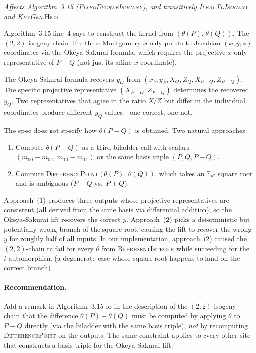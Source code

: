 \documentclass[a4paper,11pt]{article}
\newcommand{\algo}[1]{Algorithm~#1}
\newcommand{\Fpii}{\mathbb{F}_{p^2}}
\newcommand{\high}{\textsc{\color{BurntOrange}High}}
\newcommand{\finding}[2]{\noindent\textit{#1}\hfill#2\par\smallskip}
\begin{document}
\finding{Affects \algo{3.15}
(\textsc{FixedDegreeIsogeny}), and transitively
\textsc{IdealToIsogeny} and \textsc{KeyGen}.}{\high}

\algo{3.15} line~4 says to construct the kernel from
$(\theta(P),\, \theta(Q))$.  The $(2,2)$-isogeny chain lifts
these Montgomery $x$-only points to Jacobian $(x,y,z)$
coordinates via the Okeya-Sakurai formula, which requires the
projective $x$-only representative of $P{-}Q$ (not just its
affine $x$-coordinate).

The Okeya-Sakurai formula recovers $y_Q$ from
$(x_P, y_P, X_Q, Z_Q, X_{P{-}Q}, Z_{P{-}Q})$.  The specific
projective representative $(X_{P{-}Q} : Z_{P{-}Q})$ determines
the recovered $y_Q$.  Two representatives that agree in the
ratio $X/Z$ but differ in the individual coordinates produce
different $y_Q$ values---one correct, one not.

The spec does not specify how $\theta(P{-}Q)$ is obtained.
Two natural approaches:
\begin{enumerate}[nosep]
  \item Compute $\theta(P{-}Q)$ as a third biladder call with
        scalars $(m_{00}{-}m_{01},\, m_{10}{-}m_{11})$ on the
        same basis triple $(P, Q, P{-}Q)$.
  \item Compute \textsc{DifferencePoint}$(\theta(P),\, \theta(Q))$,
        which takes an $\Fpii$ square root and is ambiguous
        ($P{-}Q$ vs.\ $P{+}Q$).
\end{enumerate}

Approach~(1) produces three outputs whose projective
representatives are consistent (all derived from the same
basis via differential addition), so the Okeya-Sakurai
lift recovers the correct $y$.  Approach~(2) picks a
deterministic but potentially wrong branch of the square root,
causing the lift to recover the wrong $y$ for roughly half of
all inputs.  In our implementation, approach~(2) caused the
$(2,2)$-chain to fail for every $\theta$ from
\textsc{RepresentInteger} while succeeding for the $i$
automorphism (a degenerate case whose square root happens to
land on the correct branch).

\paragraph{Recommendation.}
Add a remark in \algo{3.15} or in the description of the
$(2,2)$-isogeny chain that the difference $\theta(P){-}\theta(Q)$
must be computed by applying $\theta$ to $P{-}Q$ directly (via
the biladder with the same basis triple), \emph{not} by
recomputing \textsc{DifferencePoint} on the outputs.  The same
constraint applies to every other site that constructs a basis
triple for the Okeya-Sakurai lift.
\end{document}
